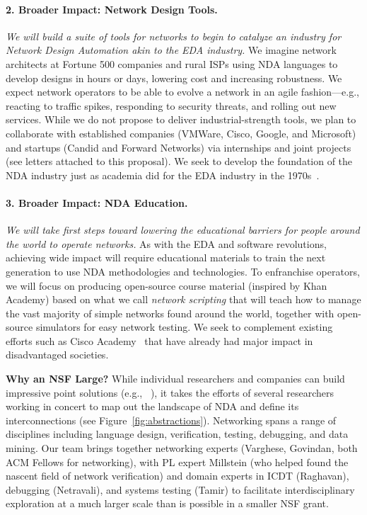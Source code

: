 \paragraph*{2. Broader Impact: Network Design Tools.}{\em We will build a suite of tools for networks to begin to catalyze an industry for Network Design Automation akin to the EDA industry.}   
%
 We imagine network architects at Fortune 500 companies and rural ISPs using NDA languages to develop designs in hours or days, lowering cost and increasing robustness. We expect network operators to be able to evolve a network in an agile fashion---e.g., reacting to traffic spikes, responding to security threats, and rolling out new services. While we do not propose to deliver industrial-strength tools, we plan to collaborate with established companies (VMWare, Cisco, Google, and Microsoft) and startups (Candid and Forward Networks) via internships and joint projects (see letters  attached to this proposal). We seek to develop the foundation of the NDA industry just as academia did for the EDA industry in the 1970s~\cite{alberto}.

\paragraph*{3. Broader Impact: NDA Education.} {\em We will take first steps toward lowering the educational barriers for people around the world to operate networks.}
%
As with the EDA and software revolutions, achieving wide impact will require educational materials to train the next generation to use NDA methodologies and technologies. To enfranchise operators, we will focus on producing open-source course material (inspired by Khan Academy) based on what we call {\em network scripting} that will teach how to manage the vast majority of simple networks found around the world, together with open-source simulators for easy network testing. We seek to complement existing efforts such as Cisco Academy~\cite{ciscoacademy} that have already had major impact in disadvantaged societies. 

{\bf Why an NSF Large?}  While individual researchers and companies can build impressive point solutions (e.g., ~\cite{b4}), it takes the efforts of several researchers working in concert to map out the landscape of NDA and define its interconnections (see Figure~\ref{fig:abstractions}). Networking spans a range of disciplines including language design, verification, testing, debugging, and data mining. Our team brings together networking experts (Varghese, Govindan, both ACM Fellows for networking), with PL expert Millstein (who helped found the nascent field of network verification) and domain experts in ICDT (Raghavan), debugging (Netravali), and systems testing (Tamir) to facilitate interdisciplinary exploration at a much larger scale than is possible in a smaller NSF grant.  

